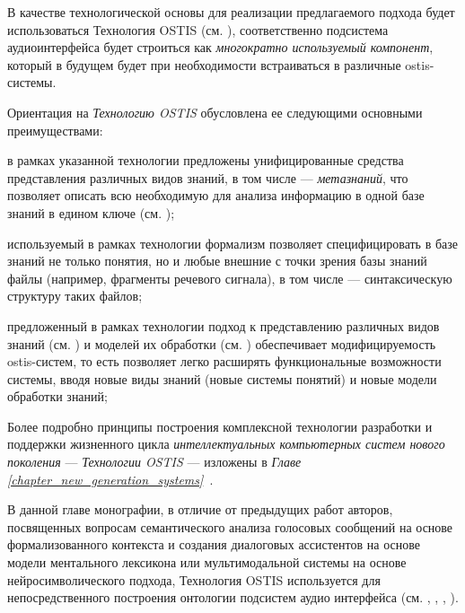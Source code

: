 В качестве технологической основы для реализации предлагаемого подхода будет использоваться Технология OSTIS (см. ), соответственно подсистема аудиоинтерфейса будет строиться как \textit{многократно используемый компонент}, который в будущем будет при необходимости встраиваться в различные ostis-системы.

Ориентация на \textit{Технологию OSTIS} обусловлена ее следующими основными преимуществами:
\begin{textitemize}
\item в рамках указанной технологии предложены унифицированные средства представления различных видов знаний, в том числе --- \textit{метазнаний}, что позволяет описать всю необходимую для анализа информацию в одной базе знаний в едином ключе (см. );
\item используемый в рамках технологии формализм позволяет специфицировать в базе знаний не только понятия, но и любые внешние с точки зрения базы знаний файлы (например, фрагменты речевого сигнала), в том числе --- синтаксическую структуру таких файлов;
\item предложенный в рамках технологии подход к представлению различных видов знаний (см. ) и моделей их обработки (см. ) обеспечивает модифицируемость ostis-систем, то есть позволяет легко расширять функциональные возможности системы, вводя новые виды знаний (новые системы понятий) и новые модели обработки знаний;
\end{textitemize}

Более подробно принципы построения комплексной технологии разработки и поддержки жизненного цикла \textit{интеллектуальных компьютерных систем нового поколения} --- \textit{Технологии OSTIS} --- изложены в \textit{Главе \ref{chapter_new_generation_systems}~}.

В данной главе монографии, в отличие от предыдущих работ авторов, посвященных вопросам семантического анализа голосовых сообщений на основе формализованного контекста и создания диалоговых ассистентов на основе модели ментального лексикона или мультимодальной системы на основе нейросимволического подхода, Технология OSTIS используется для непосредственного построения онтологии подсистем аудио интерфейса (см. , , , ).

